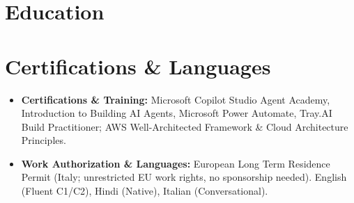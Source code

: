 \documentclass[11pt,a4paper,sans]{moderncv}
\begin{document}
\section{Education}

\section{Certifications \& Languages}
\begin{itemize}
\item \textbf{Certifications \& Training:} Microsoft Copilot Studio Agent Academy, Introduction to Building AI Agents, Microsoft Power Automate, Tray.AI Build Practitioner; AWS Well-Architected Framework \& Cloud Architecture Principles.
\item \textbf{Work Authorization \& Languages:} European Long Term Residence Permit (Italy; unrestricted EU work rights, no sponsorship needed). English (Fluent C1/C2), Hindi (Native), Italian (Conversational).
\end{itemize}
\end{document}
